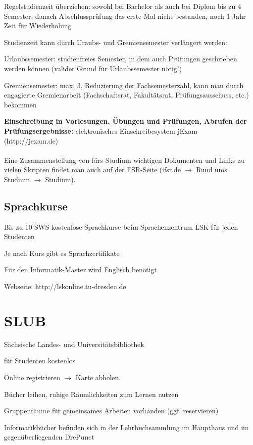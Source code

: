 \documentclass[a4paper,12pt]{report}
\begin{document}
\begin{itemize*}
    \item Regelstudienzeit überziehen: sowohl bei Bachelor als auch bei Diplom bis zu 4 Semester, danach Abschlussprüfung das erste Mal nicht bestanden, noch 1 Jahr Zeit für Wiederholung
    \item Studienzeit kann durch Uraubs- und Gremiensemester verlängert werden:
    \begin{itemize*}
        \item Urlaubssemester: studienfreies Semester, in dem auch Prüfungen geschrieben werden können (valider Grund für Urlaubssemester nötig!)
        \item Gremiensemester: max. 3, Reduzierung der Fachsemesterzahl, kann man durch engagierte Gremienarbeit (Fachschaftsrat, Fakultätsrat, Prüfungsausschuss, etc.) bekommen
    \end{itemize*}
\end{itemize*}

\textbf{Einschreibung in Vorlesungen, Übungen und Prüfungen, Abrufen der Prüfungsergebnisse: }elektronisches Einschreibesystem jExam (http://jexam.de)\\\\
Eine Zusammenstellung von fürs Studium wichtigen Dokumenten und Links zu vielen Skripten findet man auch auf der FSR-Seite (ifsr.de $\rightarrow$ Rund ums Studium $\rightarrow$ Studium).

\subsection{Sprachkurse}
\begin{itemize*}
\item Bis zu 10 SWS kostenlose Sprachkurse beim Sprachenzentrum LSK für jeden Studenten
\item Je nach Kurs gibt es Sprachzertifikate
\item Für den Informatik-Master wird Englisch benötigt
\item Webseite: http://lskonline.tu-dresden.de
\end{itemize*}

\section{SLUB}
\begin{itemize*}
    \item Sächsische Landes- und Universitätsbibliothek
    \item für Studenten kostenlos
    \item Online registrieren $\rightarrow$ Karte abholen.
    \item Bücher leihen, ruhige Räumlichkeiten zum Lernen nutzen
    \item Gruppenräume für gemeinsames Arbeiten vorhanden (ggf. reservieren)
    \item Informatikbücher befinden sich in der Lehrbuchsammlung im Haupthaus und im gegenüberliegenden \glqq DrePunct\grqq
\end{itemize*}
\end{document}

